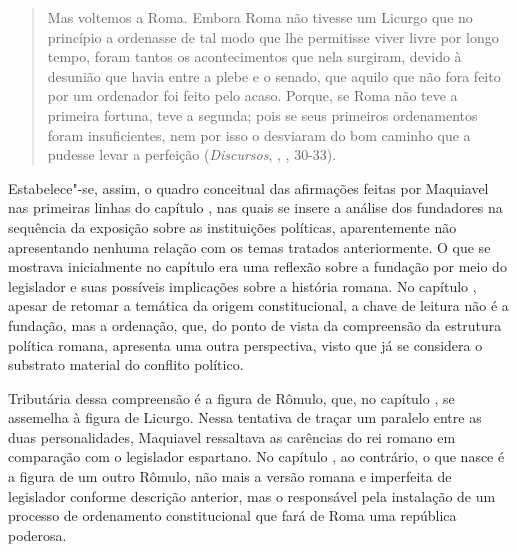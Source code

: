 \begin{quote}
Mas voltemos a Roma. Embora Roma não tivesse um Licurgo que no princípio
a ordenasse de tal modo que lhe permitisse viver livre por longo tempo,
foram tantos os acontecimentos que nela surgiram, devido à desunião que
havia entre a plebe e o senado, que aquilo que não fora feito por um
ordenador foi feito pelo acaso. Porque, se Roma não teve a primeira
fortuna, teve a segunda; pois se seus primeiros ordenamentos foram
insuficientes, nem por isso o desviaram do bom caminho que a pudesse
levar a perfeição (\emph{Discursos}, , , 30-33).
\end{quote}

Estabelece"-se, assim, o quadro conceitual das afirmações feitas por
Maquiavel nas primeiras linhas do capítulo , nas quais se insere a
análise dos fundadores na sequência da exposição sobre as instituições
políticas, aparentemente não apresentando nenhuma relação com os temas
tratados anteriormente. O que se mostrava inicialmente no capítulo 
era uma reflexão sobre a fundação por meio do legislador e suas
possíveis implicações sobre a história romana. No capítulo , apesar de
retomar a temática da origem constitucional, a chave de leitura não é a
fundação, mas a ordenação, que, do ponto de vista da compreensão da
estrutura política romana, apresenta uma outra perspectiva, visto que já
se considera o substrato material do conflito político.

Tributária dessa compreensão é a figura de Rômulo, que, no capítulo ,
se assemelha à figura de Licurgo. Nessa tentativa de traçar um paralelo
entre as duas personalidades, Maquiavel ressaltava as carências do rei
romano em comparação com o legislador espartano. No capítulo , ao
contrário, o que nasce é a figura de um outro Rômulo, não mais a versão
romana e imperfeita de legislador conforme descrição anterior, mas o
responsável pela instalação de um processo de ordenamento constitucional
que fará de Roma uma república poderosa.


